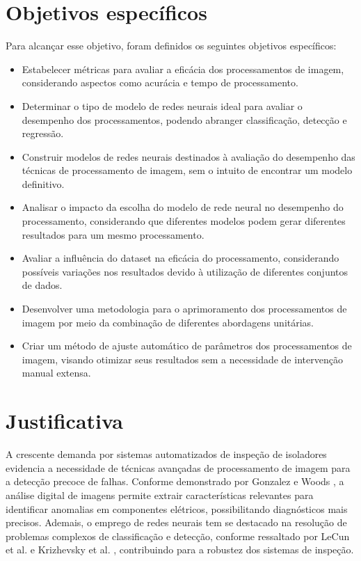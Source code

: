 \section{Objetivos específicos}

Para alcançar esse objetivo, foram definidos os seguintes objetivos específicos:

\begin{itemize}
    \item Estabelecer métricas para avaliar a eficácia dos processamentos de imagem, considerando aspectos como acurácia e tempo de processamento.
    \item Determinar o tipo de modelo de redes neurais ideal para avaliar o desempenho dos processamentos, podendo abranger classificação, detecção e regressão.
    \item Construir modelos de redes neurais destinados à avaliação do desempenho das técnicas de processamento de imagem, sem o intuito de encontrar um modelo definitivo.
    \item Analisar o impacto da escolha do modelo de rede neural no desempenho do processamento, considerando que diferentes modelos podem gerar diferentes resultados para um mesmo processamento.
    \item Avaliar a influência do dataset na eficácia do processamento, considerando possíveis variações nos resultados devido à utilização de diferentes conjuntos de dados.
    \item Desenvolver uma metodologia para o aprimoramento dos processamentos de imagem por meio da combinação de diferentes abordagens unitárias.
    \item Criar um método de ajuste automático de parâmetros dos processamentos de imagem, visando otimizar seus resultados sem a necessidade de intervenção manual extensa.
\end{itemize}

\section{Justificativa}

A crescente demanda por sistemas automatizados de inspeção de isoladores evidencia a necessidade de técnicas avançadas de processamento de imagem para a detecção precoce de falhas. Conforme demonstrado por Gonzalez e Woods \cite{Gonzalez2008}, a análise digital de imagens permite extrair características relevantes para identificar anomalias em componentes elétricos, possibilitando diagnósticos mais precisos. Ademais, o emprego de redes neurais tem se destacado na resolução de problemas complexos de classificação e detecção, conforme ressaltado por LeCun et al. \cite{LeCun2015} e Krizhevsky et al. \cite{Krizhevsky2012}, contribuindo para a robustez dos sistemas de inspeção.

